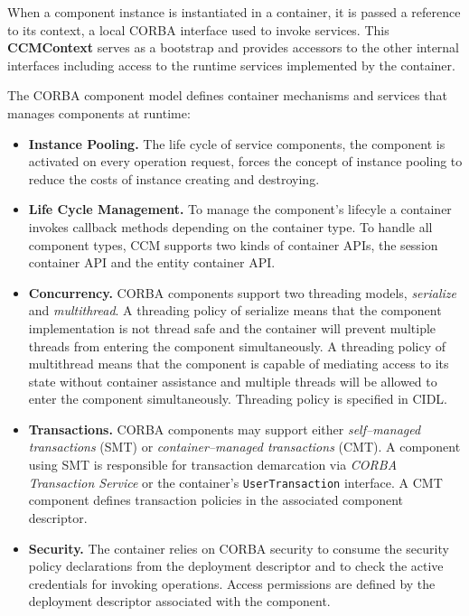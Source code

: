 \noindent
When a component instance is instantiated in a container, it is passed a 
reference to its context, a local CORBA interface used to invoke services.  
This {\bf CCMContext} serves as a bootstrap and provides accessors to the other
internal interfaces including access to the runtime services implemented by the
container. 

\vspace{3mm}
\noindent
The CORBA component model defines container mechanisms and services that 
manages components at runtime:
\begin{itemize} 

\item {\bf Instance Pooling.}
The life cycle of service components, the component is activated on every
operation request, forces the concept of instance pooling to reduce the costs
of instance creating and destroying. 

\item {\bf Life Cycle Management.}
To manage the component's lifecyle a container invokes callback methods 
depending on the container type.
To handle all component types, CCM supports two kinds of container APIs, 
the session container API and the entity container API. 

\item {\bf Concurrency.} CORBA components support two threading models, 
{\it serialize} and {\it multithread}.
A threading policy of serialize means that the component implementation is not
thread safe and the container will prevent multiple threads from entering the
component simultaneously.
A threading policy of multithread means that the component is capable of 
mediating access to its state without container assistance and multiple threads 
will be allowed to enter the component simultaneously.
Threading policy is specified in CIDL.

\item {\bf Transactions.} CORBA components may support either 
{\it self--managed transactions} (SMT) or {\it container--managed transactions} 
(CMT).
A component using SMT is responsible for transaction demarcation via 
{\it CORBA Transaction Service} or the container's {\tt UserTransaction} 
interface.
A CMT component defines transaction policies in the associated component 
descriptor. 
\item {\bf Security.} The container relies on CORBA security to consume the 
security policy declarations from the deployment descriptor and to check the 
active credentials for invoking operations.
Access permissions are defined by the deployment descriptor associated with the 
component.
\end{itemize}


